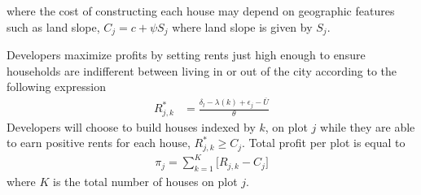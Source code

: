 \documentclass[12pt]{article}
\begin{document}


\noindent where the cost of constructing each house may depend on geographic features such as land slope, $C_{j} = c + \psi S_{j}$ where land slope is given by $S_{j}$.

Developers maximize profits by setting rents just high enough to ensure households are indifferent between living in or out of the city according to the following expression
\begin{align*}
R_{j,k}^{*} &= \frac{ \delta_{l} - \lambda(k) + \epsilon_j - \overline{U}}{\theta}
\end{align*}
Developers will choose to build houses indexed by $k$, on plot $j$ while they are able to earn positive rents for each house, $R^{*}_{j,k}\geq C_j$.  Total profit per plot is equal to 
\begin{align*}
\pi_{j} = \sum_{k=1}^{K} \Big[R_{j,k} - C_{j} \Big]
\end{align*}
\noindent where $K$ is the total number of houses on plot $j$.
\end{document}
